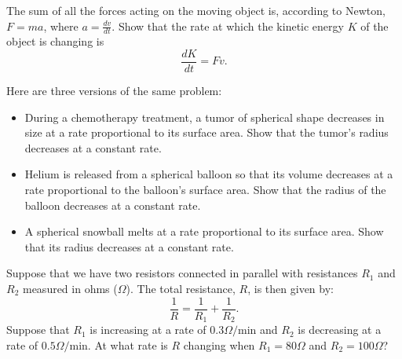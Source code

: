 \begin{multicols}{2}
\subprob The sum of all the forces acting on the moving object is, according to
Newton, $F=ma$, where $a = \frac{dv}{dt}$.  Show that the rate at which the
kinetic energy $K$ of the object is changing is
\[
  \frac{dK}{dt} = F v.
\]










\problem  Here are three versions of the same problem: 
\begin{itemize}
\item During a chemotherapy treatment, a tumor of spherical shape
  decreases in size at a rate proportional to its surface area. Show that
  the tumor's radius decreases at a constant rate.

\item Helium is released from a spherical balloon so that its volume
  decreases at a rate proportional to the balloon's surface area.  Show
  that the radius of the balloon decreases at a constant rate.

\item A spherical snowball melts at a rate proportional to its
  surface area. Show that its radius decreases at a constant rate.
\end{itemize}




\problem Suppose that we have two resistors connected in parallel with 
resistances $R_1$ and $R_2$ measured in ohms ($\Omega$).  The total
resistance, $R$, is then given by:
\[
  \frac{1}{R}=\frac{1}{R_1}+\frac{1}{R_2}.
\]
  Suppose that $R_1$ is increasing at a rate of $0.3 \Omega/\text{min}$ and $R_2$
  is decreasing at a rate of $0.5 \Omega/\text{min}$.  At what rate is $R$
changing when $R_1=80 \Omega$ and $R_2=100 \Omega$?









\end{multicols}
